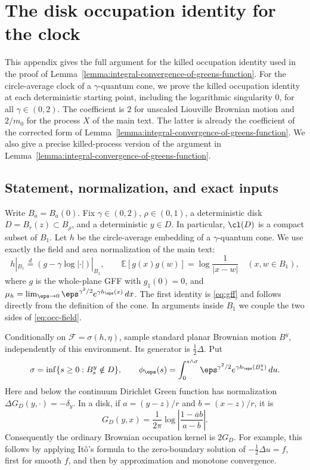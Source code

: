 \section{The disk occupation identity for the clock}\label{app:occupation-C16}

This appendix gives the full argument for the killed occupation identity
used in the proof of Lemma~\ref{lemma:integral-convergence-of-greens-function}.
For the circle-average clock of a $\gamma$-quantum cone, we prove the
killed occupation identity at each deterministic starting point,
including the logarithmic singularity $0$, for all $\gamma\in(0,2)$.
The coefficient is $2$ for unscaled Liouville Brownian motion and
$2/m_0$ for the process $X$ of the main text.
The latter is already the coefficient of the corrected form of
Lemma~\ref{lemma:integral-convergence-of-greens-function}.
We also give a precise killed-process version of the argument in
Lemma~\ref{lemma:integral-convergence-of-greens-function}.

\subsection{Statement, normalization, and exact inputs}

Write $B_a=B_a(0)$. Fix $\gamma\in(0,2)$, $\rho\in(0,1)$,
a deterministic disk $D=B_r(z)\subset B_\rho$, and a deterministic
$y\in D$. In particular, $\cl(D)$ is a compact subset of $B_1$.
Let $h$ be the circle-average embedding of a $\gamma$-quantum cone.
We use exactly the field and area normalization of the main text:
\begin{equation}\label{eq:occ-field}
 h|_{B_1}\overset{d}{=}(g-\gamma\log|\cdot|)|_{B_1},
 \qquad
 \mathbb{E}[g(x)g(w)]=\log\frac1{|x-w|}\quad(x,w\in B_1),
\end{equation}
where $g$ is the whole-plane GFF with $g_1(0)=0$, and
$\mu_h=\lim_{\eps\to0}\eps^{\gamma^2/2}e^{\gamma h_\eps(x)}\,dx$.
The first identity is \eqref{eq:gff} and follows directly from the
definition of the cone. In arguments
inside $B_1$ we couple the two sides of \eqref{eq:occ-field}.

Conditionally on $\mathcal F=\sigma(h,\eta)$, sample standard planar Brownian
motion $B^y$, independently of this environment. Its generator is
$\tfrac12\Delta$. Put
\begin{equation}\label{eq:occ-clock}
 \sigma=\inf\{s\geq0:B^y_s\notin D\},\qquad
 \phi_\eps(s)=\int_0^{s\wedge\sigma}
       \eps^{\gamma^2/2}e^{\gamma h_\eps(B^y_u)}\,du .
\end{equation}
Here and below the continuum Dirichlet Green function has normalization
$\Delta G_D(y,\cdot)=-\delta_y$. In a disk, if
$a=(y-z)/r$ and $b=(x-z)/r$, it is
\begin{equation}\label{eq:occ-green}
 G_D(y,x)=\frac1{2\pi}
     \log\left|\frac{1-\overline a b}{a-b}\right|.
\end{equation}
Consequently the ordinary Brownian occupation kernel is $2G_D$.
For example, this follows by applying It\^o's formula to the
zero-boundary solution of $-\tfrac12\Delta u=f$, first for smooth $f$,
and then by approximation and monotone convergence.

